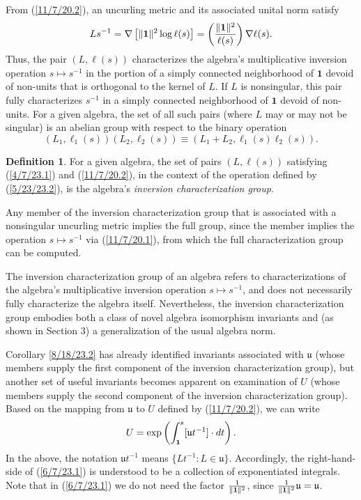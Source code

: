 \documentclass{amsart}
\numberwithin{equation}{section}
\theoremstyle{definition}
\newtheorem{definition}[theorem]{Definition}
\numberwithin{theorem}{section}
\begin{document}
    From (\ref{11/7/20.2}), an uncurling metric and its associated unital norm satisfy  \begin{equation}\label{11/7/20.1} Ls^{-1}  = \nabla\left[\|{\bf 1}\|^2\log  \ell(s)\right] =   \left(\frac{\|{\bf 1}\|^2}{ \ell(s)}\right)\nabla \ell(s).\end{equation} 
Thus, the pair $(L, \ell(s))$ characterizes the algebra's multiplicative inversion operation $s\mapsto s^{-1}$ in the portion of a simply connected neighborhood of $\mathbf{1}$ devoid of non-units that is orthogonal to the kernel of $L$.  If $L$ is nonsingular, this pair fully characterizes $s^{-1}$ in a simply connected neighborhood of $\mathbf{1}$ devoid of non-units.  For a given algebra, the set of all such pairs (where $L$ may or may not be singular) is an abelian group with respect to the binary operation 
\begin{equation}\label{5/23/23.2} (L_1, \ell_1(s))(L_2, \ell_2(s)) \equiv 
\left(L_1+L_2, \ell_1(s)  \ell_2(s)\right).\end{equation} 
\begin{definition} For a given algebra, the set of pairs $(L, \ell(s))$ satisfying (\ref{4/7/23.1}) and (\ref{11/7/20.2}), in the context of the operation defined by (\ref{5/23/23.2}), is the algebra's {\it inversion characterization group}. \end{definition}

Any member of the inversion characterization group that is associated with a nonsingular uncurling metric implies the full group, since the member implies the operation $s\mapsto s^{-1}$ via (\ref{11/7/20.1}), from which the full characterization group can be computed.

The inversion characterization group of an algebra refers to characterizations of the algebra's multiplicative inversion operation $s\mapsto s^{-1}$, and does not necessarily fully characterize the algebra itself.  
Nevertheless,  the inversion characterization group embodies both a class of  novel algebra isomorphism invariants and (as shown in Section 3) a generalization of the usual algebra norm.  

Corollary \ref{8/18/23.2} has already identified invariants associated with $\mathfrak{u}$ (whose members supply the first component of the inversion characterization group), but another set of useful invariants becomes apparent on examination of $U$ (whose members supply the second component of the inversion characterization group).  Based on the mapping from $\mathfrak{u}$ to $ U$ defined by (\ref{11/7/20.2}),  we can write \begin{equation}  U = \exp\left(\int_{\bf 1}^s [\mathfrak{u}t^{-1}]\cdot dt\right). \label{6/7/23.1}\end{equation}  In the above, the notation $\mathfrak{u}t^{-1}$ means $\{Lt^{-1}: L\in \mathfrak{u}\}$.  Accordingly, the right-hand-side of (\ref{6/7/23.1}) is understood to be a collection of exponentiated integrals.   Note that in (\ref{6/7/23.1}) we do not need the factor $\frac{1}{\|{\bf 1}\|^2}$, since $\frac{1}{\|{\bf 1}\|^2}\mathfrak{u}=\mathfrak{u}$.  
\end{document}
